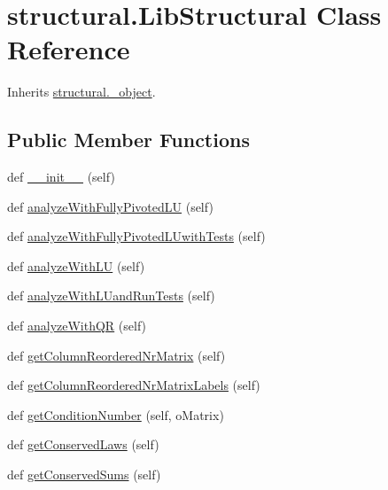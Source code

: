 \hypertarget{classstructural_1_1_lib_structural}{}\section{structural.\+Lib\+Structural Class Reference}
\label{classstructural_1_1_lib_structural}


Inherits \hyperlink{classstructural_1_1__object}{structural.\+\_\+object}.

\subsection*{Public Member Functions}
\begin{DoxyCompactItemize}
\item 
def \hyperlink{classstructural_1_1_lib_structural_aabd4602d9b1d177b4177eec4c3ab81f6}{\+\_\+\+\_\+init\+\_\+\+\_\+} (self)
\item 
def \hyperlink{classstructural_1_1_lib_structural_a1901beba2b8a4f3eec153113d3c39c7d}{analyze\+With\+Fully\+Pivoted\+LU} (self)
\item 
def \hyperlink{classstructural_1_1_lib_structural_aaf21b2714e12922795f449fd6e0350ab}{analyze\+With\+Fully\+Pivoted\+L\+Uwith\+Tests} (self)
\item 
def \hyperlink{classstructural_1_1_lib_structural_af6ab57434ca04ba9d34cbcdda6b3a82a}{analyze\+With\+LU} (self)
\item 
def \hyperlink{classstructural_1_1_lib_structural_abed584b57c919748957a4734bbf558d3}{analyze\+With\+L\+Uand\+Run\+Tests} (self)
\item 
def \hyperlink{classstructural_1_1_lib_structural_a098f1441134a9fc269c76e2769374537}{analyze\+With\+QR} (self)
\item 
def \hyperlink{classstructural_1_1_lib_structural_ad1f29e4fe2d24216835d56ae34ef0ebc}{get\+Column\+Reordered\+Nr\+Matrix} (self)
\item 
def \hyperlink{classstructural_1_1_lib_structural_a5dc6ff068ff1c6e100f0c5f121182dec}{get\+Column\+Reordered\+Nr\+Matrix\+Labels} (self)
\item 
def \hyperlink{classstructural_1_1_lib_structural_a6cbfa9b7d36558d99adb393e32615861}{get\+Condition\+Number} (self, o\+Matrix)
\item 
def \hyperlink{classstructural_1_1_lib_structural_ac268f8b279be8e6aad86ab16ba43b20f}{get\+Conserved\+Laws} (self)
\item 
def \hyperlink{classstructural_1_1_lib_structural_aa310c6870180acf84f1609e394148960}{get\+Conserved\+Sums} (self)

\end{DoxyCompactItemize}
